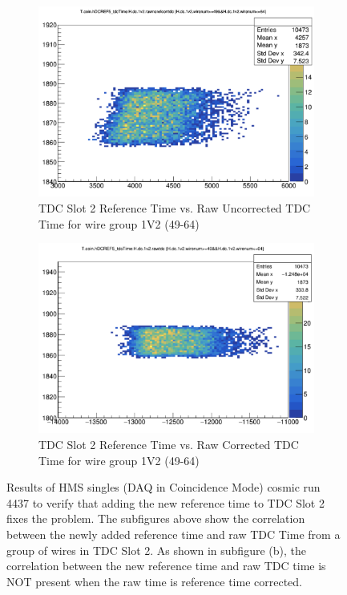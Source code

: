 \documentclass[11pt]{article}
\begin{document}
\begin{figure}[h!]
\centering
\begin{subfigure}{.5\textwidth}
  \centering
  \includegraphics[width=.8\linewidth]{hdcref5_corr.png}
  \caption{TDC Slot 2 Reference Time vs. Raw Uncorrected TDC \\Time for wire group 1V2 (49-64)}
  \label{fig:ref5_correlated}
\end{subfigure}%
\begin{subfigure}{.5\textwidth}
  \centering
  \includegraphics[width=.8\linewidth]{hdcref5_uncorr.png}
  \caption{TDC Slot 2 Reference Time vs. Raw Corrected TDC \\Time for wire group 1V2 (49-64)}
  \label{fig:ref5_uncorrelated}
\end{subfigure}
\caption{Results of HMS singles (DAQ in Coincidence Mode) cosmic run 4437 to verify that adding the new reference time to TDC Slot 2 fixes the problem.
  The subfigures above show the correlation between the newly added reference time and raw TDC Time from a group of wires in TDC Slot 2. As shown in subfigure (b), the correlation
  between the new reference time and raw TDC time is NOT present when the raw time is reference time corrected.}
\label{fig:test}
\end{figure}
\end{document}
